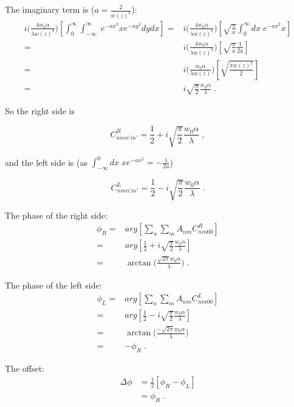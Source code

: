 \documentclass[aps,twoside,secnumarabic,balancelastpage,amsmath,amssymb,nofootinbib,hyperref=pdftex]{revtex4}
\newcommand{\bigfrac}[2]{\Big( \frac{#1}{#2}\Big)}
\begin{document}
The imaginary term is ($a = \frac{2}{w(z)^2}$):
\begin{align*}
i  \bigfrac{ 4 w_{0} \alpha}{\lambda w(z)^3}
		\left[
		\int_{0}^{\infty} \int_{-\infty}^{\infty}  \; e^{-a x^2}x e^{-a y^2} dydx \right]
=&
i  \bigfrac{ 4 w_{0} \alpha}{\lambda w(z)^3}
\left[
\sqrt{\frac{\pi}{a}}
\int_{0}^{\infty} dx\; e^{-a x^2}x
\right]
\\=&
i  \bigfrac{ 4 w_{0} \alpha}{\lambda w(z)^3}
\left[
	\sqrt{\frac{\pi}{a}}
	\frac{1}{2a}
\right]
\\=&
i  \bigfrac{ w_{0} \alpha}{\lambda w(z)}
\left[
	\sqrt{\frac{\pi w(z)^2}{2}}
\right]
\\=&
i  \sqrt{\frac{\pi}{2}}
\frac{ w_{0} \alpha}{\lambda}	
\;.
\end{align*}

So the right side is

\begin{equation}
	C_{nmn'm'}^{R} =
		\frac{1}{2}
		+
		i  \sqrt{\frac{\pi}{2}}
		\frac{ w_{0} \alpha}{\lambda}
\;,
\end{equation}

and the left side is (as $\int_{-\infty}^{0}dx \; xe^{-ax^2} = -\frac{1}{2a}$)

\begin{equation}
	C_{nmn'm'}^{L} =
		\frac{1}{2}
		-
		i  \sqrt{\frac{\pi}{2}}
		\frac{ w_{0} \alpha}{\lambda}
\;.
\end{equation}

The phase of the right side:
\begin{align*}
\phi_R =& arg \left[ \sum_{n} \sum_{m} A_{nm} C_{nm00}^{R} \right]
\\=&
	arg
	\left[
		\frac{1}{2}
		+
		i  \sqrt{\frac{\pi}{2}}
		\frac{ w_{0} \alpha}{\lambda}
	\right]
\\=&
	\arctan
		\bigfrac{
		 \sqrt{2 \pi} w_{0} \alpha}{ 			\lambda}
\;.
\end{align*}
	
The phase of the left side:
\begin{align*}
\phi_L =& arg \left[ \sum_{n} \sum_{m} A_{nm} C_{nm00}^{L} \right]
\\=&
	arg
	\left[
		\frac{1}{2}
		-
		i  \sqrt{\frac{\pi}{2}}
		\frac{ w_{0} \alpha}{\lambda}
	\right]
\\=&
	\arctan
		\bigfrac{-
		 \sqrt{2 \pi} w_{0} \alpha}{ 			\lambda}
\\=&
-\phi_R
\;.
\end{align*}

The offset:
\begin{align*}
\Delta \phi &= \frac{1}{2} \left[ \phi_R - \phi_L \right]
\\&=
\phi_R
\;.
\end{align*}
\end{document}
